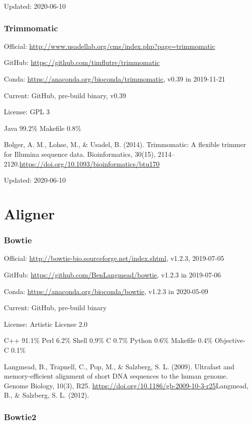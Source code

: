 \documentclass[]{article}
\begin{document}
Updated: 2020-06-10

\section{Trimmomatic}

Official: \url{http://www.usadellab.org/cms/index.php?page=trimmomatic}

GitHub: \url{https://github.com/timflutre/trimmomatic}

Conda: \url{https://anaconda.org/bioconda/trimmomatic}, v0.39 in 2019-11-21

Current: GitHub, pre-build binary, v0.39

License: GPL 3

Java 99.2\% Makefile 0.8\%

Bolger, A. M., Lohse, M., \& Usadel, B. (2014). Trimmomatic: A flexible trimmer for Illumina sequence data. Bioinformatics, 30(15), 2114–2120.\url{https://doi.org/10.1093/bioinformatics/btu170}

Updated: 2020-06-10

\part{Aligner}
\section{Bowtie}

Official: \url{http://bowtie-bio.sourceforge.net/index.shtml}, v1.2.3, 2019-07-05

GitHub: \url{https://github.com/BenLangmead/bowtie}, v1.2.3 in 2019-07-06

Conda: \url{https://anaconda.org/bioconda/bowtie}, v1.2.3 in 2020-05-09

Current: GitHub, pre-build binary

License: Artistic License 2.0

C++ 91.1\% Perl 6.2\% Shell 0.9\% C 0.7\% Python 0.6\% Makefile 0.4\% Objective-C 0.1\%

Langmead, B., Trapnell, C., Pop, M., \& Salzberg, S. L. (2009). Ultrafast and memory-efficient alignment of short DNA sequences to the human genome. Genome Biology, 10(3), R25. \url{https://doi.org/10.1186/gb-2009-10-3-r25}Langmead, B., \& Salzberg, S. L. (2012).

\section{Bowtie2}
\end{document}
